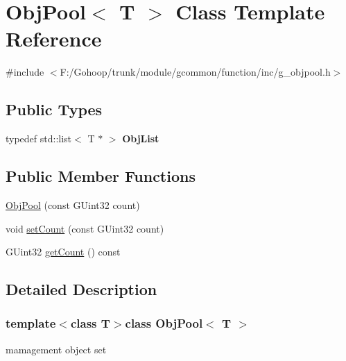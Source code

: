 \hypertarget{class_obj_pool}{\section{Obj\-Pool$<$ T $>$ Class Template Reference}
\label{class_obj_pool}
}


{\ttfamily \#include $<$F\-:/\-Gohoop/trunk/module/gcommon/function/inc/g\-\_\-objpool.\-h$>$}

\subsection*{Public Types}
\begin{DoxyCompactItemize}
\item 
\hypertarget{class_obj_pool_a14ab448fcb58c1034e3be9edbc83944b}{typedef std\-::list$<$ T $\ast$ $>$ {\bfseries Obj\-List}}\label{class_obj_pool_a14ab448fcb58c1034e3be9edbc83944b}

\end{DoxyCompactItemize}
\subsection*{Public Member Functions}
\begin{DoxyCompactItemize}
\item 
\hyperlink{class_obj_pool_a948b87fdb2e1d9da7dc3fbe6cdad3eee}{Obj\-Pool} (const G\-Uint32 count)
\item 
void \hyperlink{class_obj_pool_a7a23340fe2e11f7b23d6fb4dae5cbef1}{set\-Count} (const G\-Uint32 count)
\item 
G\-Uint32 \hyperlink{class_obj_pool_a4038ce92db308312a7703748391d19ec}{get\-Count} () const 
\end{DoxyCompactItemize}


\subsection{Detailed Description}
\subsubsection*{template$<$class T$>$class Obj\-Pool$<$ T $>$}

mamagement object set 

